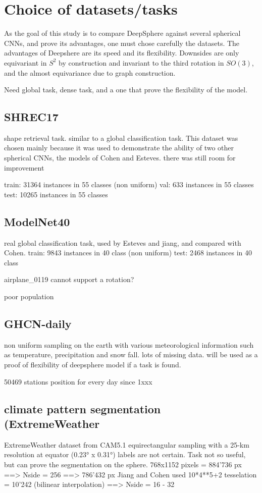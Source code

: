 \documentclass[11pt]{report}
\begin{document}
\section{Choice of datasets/tasks}
As the goal of this study is to compare DeepSphere against several spherical CNNs, and prove its advantages, one must chose carefully the datasets. The advantages of Deepshere are its speed and its flexibility. Downsides are only equivariant in $S^2$ by construction and invariant to the third rotation in $SO(3)$, and the almost equivariance due to graph construction.

Need global task, dense task, and a one that prove the flexibility of the model.
\subsection{SHREC17}
shape retrieval task. similar to a global classification task.
This dataset was chosen mainly because it was used to demonstrate the ability of two other spherical CNNs, the models of Cohen and Esteves. there was still room for improvement

train: 31364 instances in 55 classes (non uniform)
val: 633 instances in 55 classes
test: 10265 instances in 55 classes
\subsection{ModelNet40}
real global classification task, used by Esteves and jiang, and compared with Cohen.
train: 9843 instances in 40 class (non uniform)
test: 2468 instances in 40 class

airplane\_0119 cannot support a rotation?

poor population
\subsection{GHCN-daily}
non uniform sampling on the earth with various meteorological information such as temperature, precipitation and snow fall. lots of missing data. will be used as a proof of flexibility of deepsphere model if a task is found.

50469 stations position for every day since 1xxx

\subsection{climate pattern segmentation (ExtremeWeather}
ExtremeWeather dataset from CAM5.1
equirectangular sampling with a 25-km resolution at equator (0.23° x 0.31°) 
labels are not certain. Task not so useful, but can prove the segmentation on the sphere.
768x1152 pixels = 884'736 px ==> Nside = 256 ==> 786'432 px
Jiang and Cohen used 10*4**5+2 tesselation = 10'242 (bilinear interpolation) ==> Nside = 16 - 32
\end{document}
